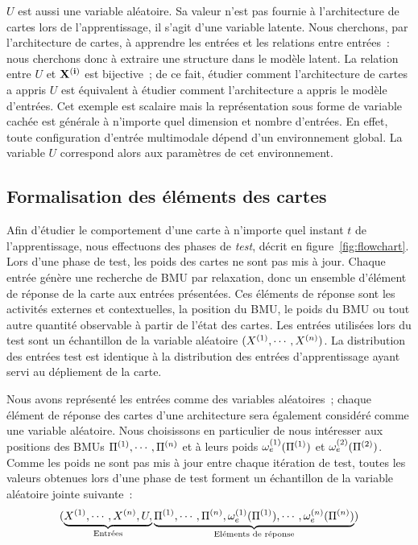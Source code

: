 \documentclass[../main]{subfiles}
\begin{document}
$U$ est aussi une variable aléatoire. Sa valeur n'est pas fournie à l'architecture de cartes lors de l'apprentissage, il s'agit d'une variable latente.
Nous cherchons, par l'architecture de cartes, à apprendre les entrées et les relations entre entrées~: nous cherchons donc à extraire une structure dans le modèle latent. La relation entre $U$ et $\mathbf{X^{({i})}}$ est bijective~; de ce fait, étudier comment l'architecture de cartes a appris $U$ est équivalent à étudier comment l'architecture a appris le modèle d'entrées.
Cet exemple est scalaire mais la représentation sous forme de variable cachée est générale à n'importe quel dimension et nombre d'entrées. 
En effet, toute configuration d'entrée multimodale dépend d'un environnement global. La variable $U$ correspond alors aux paramètres de cet environnement.

\subsection{Formalisation des éléments des cartes}

Afin d'étudier le comportement d'une carte à n'importe quel instant $t$ de l'apprentissage, nous effectuons des phases de \emph{test}, décrit en figure~\ref{fig:flowchart}.
Lors d'une phase de test, les poids des cartes ne sont pas mis à jour. Chaque entrée génère une recherche de BMU par relaxation, donc un ensemble d'élément de réponse de la carte aux entrées présentées. Ces éléments de réponse sont les activités externes et contextuelles, la position du BMU, le poids du BMU ou tout autre quantité observable à partir de l'état des cartes.
Les entrées utilisées lors du test sont un échantillon de la variable aléatoire $(X^{({1})}, \cdots, X^{({n})})$.
La distribution des entrées test est identique à la distribution des entrées d'apprentissage ayant servi au dépliement de la carte.

Nous avons représenté les entrées comme des variables aléatoires~; chaque élément de réponse des cartes d'une architecture sera également considéré comme une variable aléatoire.
Nous choisissons en particulier de nous intéresser aux positions des BMUs $\Pi^{({1})}, \cdots, \Pi^{({n})}$ et à leurs poids $\omega_{e}^{({1})}(\Pi^{({1})})$ et $\omega_{e}^{({2})}(\Pi^{({2})})$.
Comme les poids ne sont pas mis à jour entre chaque itération de test, toutes les valeurs obtenues lors d'une phase de test forment un échantillon de la variable aléatoire jointe suivante~:
$$(\underbrace{X^{({1})}, \cdots, X^{({n})}, U,}_{\text{Entrées}} \underbrace{\Pi^{({1})}, \cdots, \Pi^{({n})}, \omega_e^{({1})}(\Pi^{({1})}), \cdots, \omega_e^{({n})}(\Pi^{({n})})}_{\text{Eléments de réponse}})$$
\end{document}
